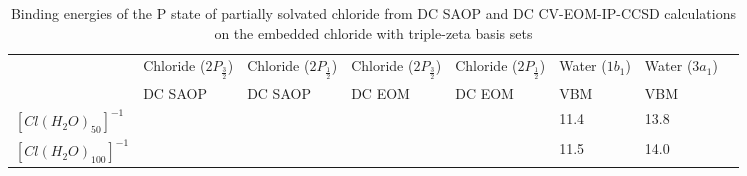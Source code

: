 \documentclass[a4paper,11pt]{report}
\begin{document}
\begin{table}[H]\small
\begin{center}
\caption{Binding energies of the P state of partially solvated chloride from DC SAOP and DC CV-EOM-IP-CCSD calculations on the embedded chloride with triple-zeta basis sets} \label{tab:1}
\begin{tabular}{|l|l|l|l|l|l|l|l|}
\hline
&Chloride ($2P_{\frac{3}{2}}$)&Chloride ($2P_{\frac{1}{2}}$)&Chloride ($2P_{\frac{3}{2}}$)&Chloride ($2P_{\frac{1}{2}}$)&Water ($1b_{1}$)&Water ($3a_{1}$)\\
&\hspace*{0.5cm} DC SAOP &\hspace*{0.5cm} DC SAOP&DC EOM&DC EOM&\hspace*{0.5cm}VBM &\hspace*{0.5cm}VBM\\ 
\hline
$[Cl(H_{2}O)_{50}]^{-1}$&\hspace*{0.5cm}&\hspace*{0.5cm}&&&\hspace*{0.5cm}11.4&\hspace*{0.5cm}13.8\\
\hline
$[Cl(H_{2}O)_{100}]^{-1}$&\hspace*{0.5cm}&\hspace*{0.5cm}&&&\hspace*{0.5cm}11.5&\hspace*{0.5cm}14.0\\
\hline
\end{tabular}
\label{table1m}
\end{center}
\end{table}
\end{document}
